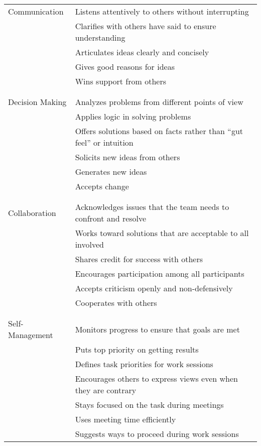 \noindent
\begin{longtable}{p{}p{}}

  Communication
  & Listens attentively to others without interrupting \\
  & Clarifies with others have said to ensure understanding \\
  & Articulates ideas clearly and concisely \\
  & Gives good reasons for ideas \\
  & Wins support from others \\
  \\ [-1.5ex] \hline \\ [-1.5ex]

  Decision Making
  & Analyzes problems from different points of view \\
  & Applies logic in solving problems \\
  & Offers solutions based on facts rather than ``gut feel'' or intuition \\
  & Solicits new ideas from others \\
  & Generates new ideas \\
  & Accepts change \\
  \\ [-1.5ex] \hline \\ [-1.5ex]

  Collaboration
  & Acknowledges issues that the team needs to confront and resolve \\
  & Works toward solutions that are acceptable to all involved \\
  & Shares credit for success with others \\
  & Encourages participation among all participants \\
  & Accepts criticism openly and non-defensively \\
  & Cooperates with others \\
  \\ [-1.5ex] \hline \\ [-1.5ex]

  Self-Management
  & Monitors progress to ensure that goals are met \\
  & Puts top priority on getting results \\
  & Defines task priorities for work sessions \\
  & Encourages others to express views even when they are contrary \\
  & Stays focused on the task during meetings \\
  & Uses meeting time efficiently \\
  & Suggests ways to proceed during work sessions \\

\end{longtable}

